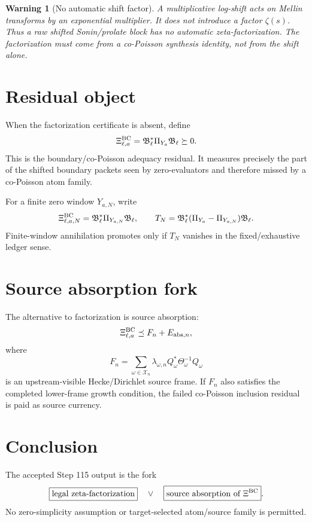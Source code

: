 \documentclass[11pt]{article}
\newtheorem{warning}{Warning}
\begin{document}
\begin{warning}[No automatic shift factor]
A multiplicative log-shift acts on Mellin transforms by an exponential multiplier.  It does not introduce a factor $\zeta(s)$.  Thus a raw shifted Sonin/prolate block has no automatic zeta-factorization.  The factorization must come from a co-Poisson synthesis identity, not from the shift alone.
\end{warning}

\section{Residual object}
When the factorization certificate is absent, define
\[
\Xi^{\rm BC}_{\ell,a}
=\mathfrak B_\ell^*\Pi_{Y_a}\mathfrak B_\ell\succeq0.
\]
This is the boundary/co-Poisson adequacy residual.  It measures precisely the part of the shifted boundary packets seen by zero-evaluators and therefore missed by a co-Poisson atom family.

For a finite zero window $Y_{a,N}$, write
\[
\Xi^{\rm BC}_{\ell,a,N}
=\mathfrak B_\ell^*\Pi_{Y_{a,N}}\mathfrak B_\ell,
\qquad
T_N=\mathfrak B_\ell^*(\Pi_{Y_a}-\Pi_{Y_{a,N}})\mathfrak B_\ell.
\]
Finite-window annihilation promotes only if $T_N$ vanishes in the fixed/exhaustive ledger sense.

\section{Source absorption fork}
The alternative to factorization is source absorption:
\[
\Xi^{\rm BC}_{\ell,a}\preceq F_n+E_{{\rm abs},n},
\]
where
\[
F_n=\sum_{\omega\in\mathcal X_n}\lambda_{\omega,n}Q_\omega^*\Theta_\omega^{-1}Q_\omega
\]
is an upstream-visible Hecke/Dirichlet source frame.  If $F_n$ also satisfies the completed lower-frame growth condition, the failed co-Poisson inclusion residual is paid as source currency.

\section{Conclusion}
The accepted Step 115 output is the fork
\[
\boxed{\text{legal zeta-factorization}}
\quad\lor\quad
\boxed{\text{source absorption of }\Xi^{\rm BC}}.
\]
No zero-simplicity assumption or target-selected atom/source family is permitted.
\end{document}
